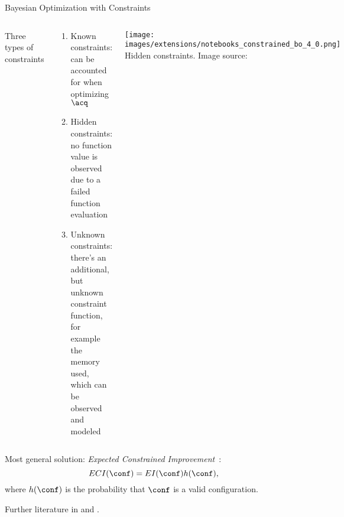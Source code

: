 \begin{frame}[c]{Bayesian Optimization with Constraints}

\begin{columns}[T]


Three types of constraints 
\begin{small}
\begin{enumerate}
    \item Known constraints: can be accounted for when optimizing $\acq$
    \item Hidden constraints: no function value is observed due to a failed function evaluation~
    \item Unknown constraints: there's an additional, but unknown constraint function, for example the memory used, which can be observed and modeled
\end{enumerate}
\end{small}

\texttt{[image: images/extensions/notebooks\_constrained\_bo\_4\_0.png]}\\
	\footnotesize{Hidden constraints. Image source: }

\end{columns}

Most general solution: \emph{Expected Constrained Improvement}~:
\vspace{-0.1cm}
\begin{equation}
    ECI(\conf) = EI(\conf)h(\conf),
\end{equation}
\vspace{-0.1cm}
where $h(\conf)$ is the probability that $\conf$ is a valid configuration.

\vspace{0.1cm}
Further literature in  and .

\end{frame}
